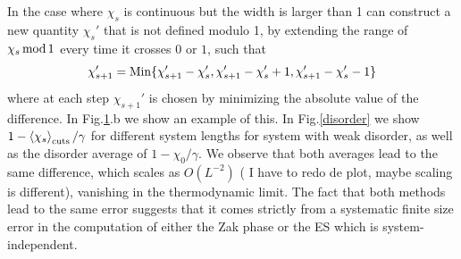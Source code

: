 \documentclass[twocolumn,amsmath,longbibliography,amssymb,superscriptaddress]{revtex4-1}
\newcommand{\carlos}[1]{{\color{red} #1}}
\begin{document}
\begin{figure}[h!]
\centering
{}\hspace{0mm}

\label{inh}
\end{figure}

In the case where $\chi_s$ is continuous but the width is larger than 1 can construct a new quantity $\chi_s'$ that is not defined modulo 1, by extending the range of $\chi_s \, {\rm mod} \, 1$ every time it crosses $0$ or $1$, such that
\begin{equation}
\chi_{s+1}' = {\rm Min}\{\chi'_{s+1}-\chi'_s,\chi'_{s+1}-\chi'_s+1,\chi'_{s+1}-\chi'_s-1\}
\end{equation}
where at each step $\chi_{s+1}'$ is chosen by minimizing the absolute value of the difference. In Fig.\ref{inh}.b we show an example of this. In Fig.\ref{disorder} we show $1-\expval{\chi_s}_{\rm cuts}/\gamma$ for different system lengths for system with weak disorder, as well as the disorder average of $1-\chi_0/\gamma$. We observe that both averages lead to the same difference, which scales as $O(L^{-2})$ (\carlos{I have to redo de plot, maybe scaling is different}), vanishing in the thermodynamic limit. The fact that both methods lead to the same error suggests that it comes strictly from a systematic finite size error in the computation of either the Zak phase or the ES which is system-independent. 
\end{document}
